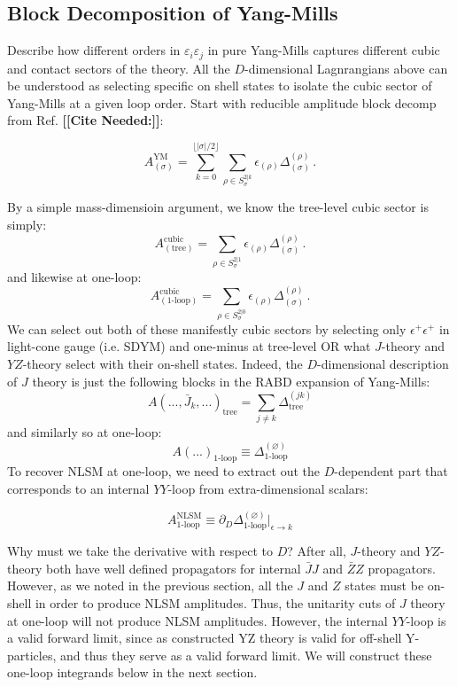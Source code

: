 \documentclass[11pt,letter]{article}
\def\be{\begin{equation}}
\def\ee{\end{equation}}
\newcommand{\citepls}[1]{{\bf\color{red}[[Cite Needed:#1]]}}
\begin{document}
\subsection{Block Decomposition of Yang-Mills}
Describe how different orders in $\varepsilon_i\varepsilon_j$ in pure Yang-Mills captures different cubic and contact sectors of the theory. All the $D$-dimensional Lagnrangians above can be understood as selecting specific on shell states to isolate the cubic sector of Yang-Mills at a given loop order. Start with reducible amplitude block decomp from Ref. \citepls{}:
\begin{eBox}
\begin{equation}\label{eq:pureVecRABD}
A_{(\sigma)}^{\text{YM}} = \sum_{k=0}^{\lfloor |\sigma|/2\rfloor}\sum_{\rho \in S^{2|k}_{\sigma}}\epsilon_{(\rho)} \Delta_{(\sigma)}^{(\rho)}\,.
\end{equation}
\end{eBox}
By a simple mass-dimensioin argument, we know the tree-level cubic sector is simply:
\be
A_{(\text{tree})}^{\text{cubic}} = \sum_{\rho \in S^{2|1}_{\sigma}}\epsilon_{(\rho)} \Delta_{(\sigma)}^{(\rho)}\,.
\ee
and likewise at one-loop:
\be
A_{(\text{1-loop})}^{\text{cubic}} = \sum_{\rho \in S^{2|0}_{\sigma}}\epsilon_{(\rho)} \Delta_{(\sigma)}^{(\rho)}\,.
\ee
We can select out both of these manifestly cubic sectors by selecting only $\epsilon^+\epsilon^+$ in light-cone gauge (i.e. SDYM) and one-minus at tree-level OR what $J$-theory and $YZ$-theory select with their on-shell states. Indeed, the $D$-dimensional description of $J$ theory is just the following blocks in the RABD expansion of Yang-Mills:
\be
A(...,\bar{J}_k,...)_{\text{tree}} = \sum_{j\neq k}\Delta^{(jk)}_{\text{tree}}
\ee
and similarly so at one-loop:
\be
A(...)_{\text{1-loop}} \equiv \Delta^{(\varnothing)}_{\text{1-loop}}
\ee
To recover NLSM at one-loop, we need to extract out the $D$-dependent part that corresponds to an internal $YY$-loop from extra-dimensional scalars:
\begin{eBox}
\be
A^{\text{NLSM}}_{\text{1-loop}} \equiv \partial_D \Delta^{(\varnothing)}_{\text{1-loop}}\big|_{\epsilon\rightarrow k}
\ee
\end{eBox}
Why must we take the derivative with respect to $D$? After all, $J$-theory and $YZ$-theory both have well defined propagators for internal $\bar{J}J$ and $\bar{Z}Z$ propagators. However, as we noted in the previous section, all the $J$ and $Z$ states must be on-shell in order to produce NLSM amplitudes. Thus, the unitarity cuts of $J$ theory at one-loop will not produce NLSM amplitudes. However, the internal $YY$-loop is a valid forward limit, since as constructed YZ theory is valid for off-shell Y-particles, and thus they serve as a valid forward limit. We will construct these one-loop integrands below in the next section. 
\end{document}
